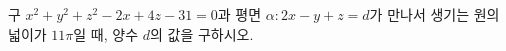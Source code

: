 구 $x^2+y^2+z^2-2x+4z-31=0$과 평면 $\alpha\colon 2x-y+z=d$가 만나서 생기는 원의 넓이가 $11\pi$일 때, 양수 $d$의 값을 구하시오.
